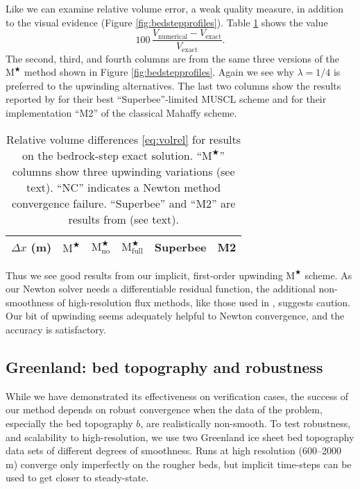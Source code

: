 \documentclass[twocolumn,letterpaper]{igs}
\newcommand{\Mstar}{$\text{M}^{\bigstar}$\xspace}
\newcommand{\Mstarnoup}{$\text{M}^{\bigstar}_{\text{no}}$\xspace}
\newcommand{\Mstarfullup}{$\text{M}^{\bigstar}_{\text{full}}$\xspace}
\begin{document}
Like \cite{JaroschSchoofAnslow2013} we can examine relative volume error, a weak quality measure, in addition to the visual evidence (Figure \ref{fig:bedstepprofiles}).  Table \ref{tab:bedstepvol} shows the value
\begin{equation}
100\, \frac{V_{\text{numerical}} - V_{\text{exact}}}{V_{\text{exact}}}. \label{eq:volrel}
\end{equation}
The second, third, and fourth columns are from the same three versions of the \Mstar method shown in Figure \ref{fig:bedstepprofiles}.  Again we see why $\lambda=1/4$ is preferred to the upwinding alternatives.  The last two columns show the results reported by \cite{JaroschSchoofAnslow2013} for their best ``Superbee''-limited MUSCL scheme and for their implementation ``M2'' of the classical Mahaffy scheme.

\begin{table}[ht]
  \caption{Relative volume differences \eqref{eq:volrel} for results on the \cite{JaroschSchoofAnslow2013} bedrock-step exact solution.  ``\Mstar'' columns show three upwinding variations (see text).  ``NC'' indicates a Newton method convergence failure.  ``Superbee'' and ``M2'' are results from \cite{JaroschSchoofAnslow2013} (see text).}
  \vskip4mm \centering
  \begin{tabular}{lccccc}
    $\Delta x$ (m) & \Mstar & \Mstarnoup & \Mstarfullup & Superbee & M2 \\  \hline

  \end{tabular}
  \label{tab:bedstepvol}
\end{table}

Thus we see good results from our implicit, first-order upwinding \Mstar scheme.  As our Newton solver needs a differentiable residual function, the additional non-smoothness of high-resolution flux methods, like those used in \cite{JaroschSchoofAnslow2013}, suggests caution.  Our bit of upwinding seems adequately helpful to Newton convergence, and the accuracy is satisfactory.

\subsection{Greenland: bed topography and robustness}

While we have demonstrated its effectiveness on verification cases, the success of our method depends on robust convergence when the data of the problem, especially the bed topography $b$, are realistically non-smooth.  To test robustness, and scalability to high-resolution, we use two Greenland ice sheet bed topography data sets of different degrees of smoothness.  Runs at high resolution (600--2000 m) converge only imperfectly on the rougher beds, but implicit time-steps can be used to get closer to steady-state.
\end{document}
